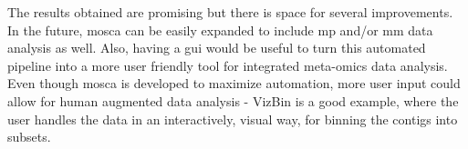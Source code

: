 \documentclass[
  oneside,
  11pt, a4paper,
  footinclude=true,
  headinclude=true,
  cleardoublepage=empty
]{scrbook}
\begin{document}
    The results obtained are promising but there is space for several improvements. In the future, \gls{mosca} can be easily expanded to include \gls{mp} and/or \gls{mm} data analysis as well. Also, having a \gls{gui} would be useful to turn this automated pipeline into a more user friendly tool for integrated meta-omics data analysis. Even though \gls{mosca} is developed to maximize automation, more user input could allow for human augmented data analysis - VizBin is a good example, where the user handles the data in an interactively, visual way, for binning the contigs into subsets.
    

\end{document}
